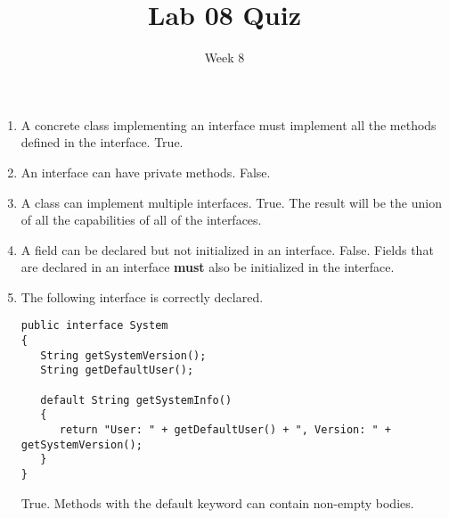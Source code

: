 \documentclass[12pt]{article}
\title{Lab 08 Quiz}
\date{Week 8}
\begin{document}
 

\Instructions

\begin{enumerate}
\vspace{2em}

\item {} \tf A concrete class implementing an interface must implement all the methods defined in the interface.
\ifdraft
\Ans True. 
\fi
\vspace{3em}
\item {} \tf An interface can have private methods.
\ifdraft	 
\Ans False.
\fi
\vspace{2em}

\item {} \tf A class can implement multiple interfaces.
\ifdraft
\Ans True. The result will be the union of all the capabilities of all of the interfaces.
\fi
\vspace{2em}

\item {} \tf A field can be declared but not initialized in an interface.
\ifdraft
\Ans False. Fields that are declared in an interface  \textbf{must} also be initialized in the interface.
\fi
\vspace{2em}

\item {} \tf The following interface is correctly declared.
\begin{lstlisting}
public interface System
{
   String getSystemVersion();
   String getDefaultUser();

   default String getSystemInfo()
   {
      return "User: " + getDefaultUser() + ", Version: " + getSystemVersion();
   }
}
\end{lstlisting}
\ifdraft
\Ans True. Methods with the default keyword can contain non-empty bodies.
\fi
\end{enumerate}   
\end{document}
